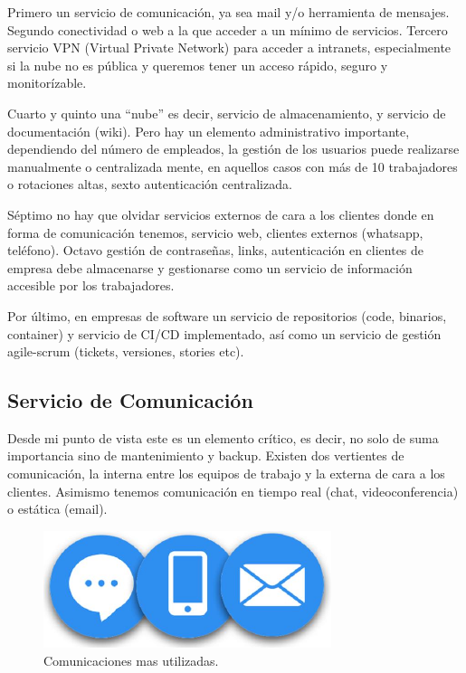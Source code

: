 Primero un servicio de comunicación, ya sea mail y/o herramienta de mensajes. Segundo conectividad o web a la que acceder a un mínimo de servicios. Tercero servicio VPN (Virtual Private Network) para acceder a intranets, especialmente si la nube no es pública y queremos tener un acceso rápido, seguro y monitorízable.

Cuarto y quinto una “nube” es decir, servicio de almacenamiento, y servicio de documentación (wiki). Pero hay un elemento administrativo importante, dependiendo del número de empleados, la gestión de los usuarios puede realizarse manualmente o centralizada mente, en aquellos casos con más de 10 trabajadores o rotaciones altas, sexto autenticación centralizada.

Séptimo no hay que olvidar servicios externos de cara a los clientes donde en forma de comunicación tenemos, servicio web, clientes externos (whatsapp, teléfono). Octavo gestión de contraseñas, links, autenticación en clientes de empresa debe almacenarse y gestionarse como un servicio de información accesible por los trabajadores.

Por último, en empresas de software un servicio de repositorios (code, binarios, container) y servicio de CI/CD implementado, así como un servicio de gestión agile-scrum (tickets, versiones, stories etc).

\subsection{Servicio de Comunicación}
Desde mi punto de vista este es un elemento crítico, es decir, no solo de suma importancia sino de mantenimiento y backup. Existen dos vertientes de comunicación, la interna entre los equipos de trabajo y la externa de cara a los clientes. Asimismo tenemos comunicación en tiempo real (chat, videoconferencia) o estática (email).

\begin{figure}[!htb]
\begin{center}
\includegraphics[width=0.75\textwidth]{./figuras/comunicacion.jpg}
\caption{Comunicaciones mas utilizadas.}
\label{F:comunicacion}
\end{center}
\end{figure}

